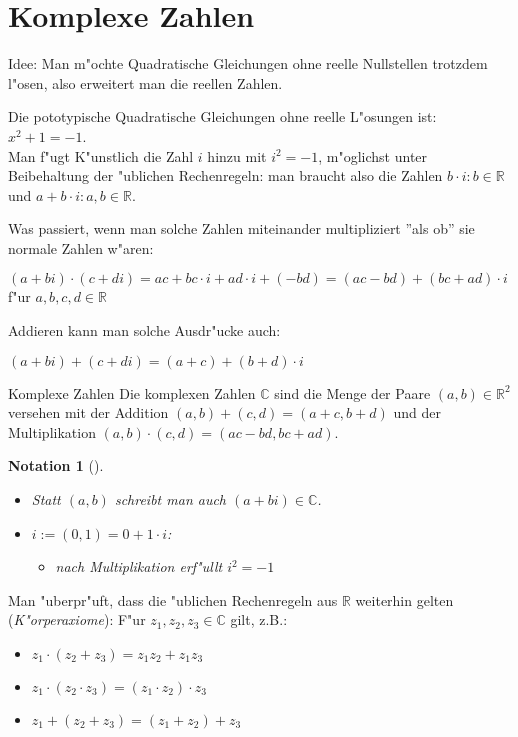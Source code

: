 \documentclass[11pt]{article}
\newtheorem*{notation}{Notation}
\begin{document}
\section{Komplexe Zahlen}
\label{sec:org73b0a26}
Idee: Man m"ochte Quadratische Gleichungen ohne reelle Nullstellen trotzdem
l"osen, also erweitert man die reellen Zahlen.

\begin{relation}
Die pototypische Quadratische Gleichungen ohne reelle L"osungen ist: \(x^2+1 =
-1\).\\
Man f"ugt K"unstlich die Zahl \(i\) hinzu mit \(i^2=-1\), m"oglichst unter
Beibehaltung der "ublichen Rechenregeln: man braucht also die Zahlen \(b\cdot i :
b\in \mathbb{R}\) und \(a+b\cdot i :  a,b\in \mathbb{R}\).
\end{relation}

Was passiert, wenn man solche Zahlen miteinander multipliziert ''als ob'' sie
normale Zahlen w"aren: 
\begin{relation}
\((a+bi)\cdot(c+di)=ac+bc\cdot i+ad\cdot i+(-bd)=(ac-bd)+(bc+ad)\cdot i\) f"ur \(a,b,c,d\in \mathbb{R}\)
\end{relation}

Addieren kann man solche Ausdr"ucke auch:
\begin{relation}
\((a+bi)+(c+di)=(a+c)+(b+d)\cdot i\)
\end{relation}

\begin{definition}{Komplexe Zahlen}{}
Die komplexen Zahlen \(\mathbb{C}\) sind die Menge der Paare \((a,b)\in
\mathbb{R}^2\) versehen mit der Addition \((a,b)+(c,d)=(a+c,b+d)\) und der
Multiplikation \((a,b)\cdot (c,d)=(ac-bd, bc+ad)\).
\end{definition}

\begin{notation}[] \label{} \
\begin{itemize}
\item Statt \((a,b)\) schreibt man auch \((a+bi)\in \mathbb{C}\).
\item \(i:=(0,1)=0+1\cdot i\):
\begin{itemize}
\item nach Multiplikation erf"ullt \(i^2=-1\)
\end{itemize}
\end{itemize}
\end{notation}

Man "uberpr"uft, dass die "ublichen Rechenregeln aus \(\mathbb{R}\) weiterhin
gelten (\emph{K"orperaxiome}): F"ur \(z_1, z_2, z_3 \in \mathbb{C}\) gilt, z.B.:
\begin{relation}
\begin{itemize}
\item \(z_1\cdot (z_2+z_3)=z_1z_2+z_1z_3\)
\item \(z_1\cdot (z_2\cdot z_3)=(z_1\cdot z_2)\cdot z_3\)
\item \(z_1 + (z_2 + z_3)=(z_1 + z_2) + z_3\)
\end{itemize}
\end{relation}
\end{document}
